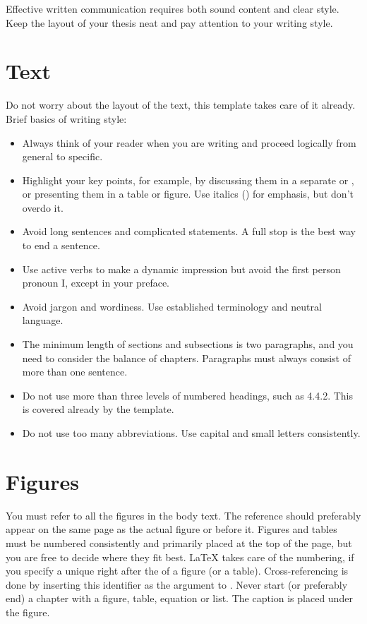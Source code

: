 Effective written communication requires both sound content and clear style. Keep the layout of your thesis neat and pay attention to your writing style.

\section{Text}

Do not worry about the layout of the text, this template takes care of it already. Brief basics of writing style:
\begin{itemize}
\item Always think of your reader when you are writing and proceed logically from general to specific.
\item Highlight your key points, for example, by discussing them in a separate  or , or presenting them in a table or figure. Use italics () for emphasis, but don’t overdo it. 
\item Avoid long sentences and complicated statements. A full stop is the best way to end a sentence. 
\item Use active verbs to make a dynamic impression but avoid the first person pronoun I, except in your preface. 
\item Avoid jargon and wordiness. Use established terminology and neutral language.
\item The minimum length of sections and subsections is two paragraphs, and you need to consider the balance of chapters. Paragraphs must always consist of more than one sentence. 
\item Do not use more than three levels of numbered headings, such as 4.4.2. This is covered already by the template.
\item Do not use too many abbreviations. Use capital and small letters consistently.
\end{itemize}

\section{Figures}

You must refer to all the figures in the body text. The reference should preferably appear on the same page as the actual figure or before it. Figures and tables must be numbered consistently and primarily placed at the top of the page, but you are free to decide where they fit best. \LaTeX{} takes care of the numbering, if you specify a unique  right after the  of a figure (or a table). Cross-referencing is done by inserting this identifier as the argument to . Never start (or preferably end) a chapter with a figure, table, equation or list. The caption is placed under the figure.

